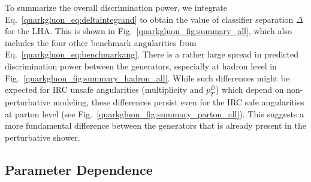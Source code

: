 \documentclass[11pt]{cernrep}
\begin{document}
To summarize the overall discrimination power, we integrate Eq.~\eqref{quarkgluon_eq:deltaintegrand} to obtain the value of classifier separation $\Delta$ for the LHA.  This is shown in Fig.~\ref{quarkgluon_fig:summary_all}, which also includes the four other benchmark angularities from Eq.~\eqref{quarkgluon_eq:benchmarkang}.  There is a rather large spread in predicted discrimination power between the generators, especially at hadron level in Fig.~\ref{quarkgluon_fig:summary_hadron_all}.  While such differences might be expected for IRC unsafe angularities (multiplicity and $p_T^D$) which depend on non-perturbative modeling, these differences persist even for the IRC safe angularities at parton level (see Fig.~\ref{quarkgluon_fig:summary_parton_all}).  This suggests a more fundamental difference between the generators that is already present in the perturbative shower.

\subsection{Parameter Dependence}
\label{quarkgluon_sec:ee_scales}
\end{document}
